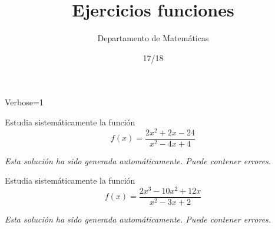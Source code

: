 \documentclass[palatino,nosec]{Docencia}
\title{Ejercicios funciones}
\author{Departamento de Matemáticas}
\date{17/18}
\begin{document}
\pagestyle{plain}


\newif\ifverbose
\verbosetrue
\ifverbose
\begin{sagesilent}
	Verbose=1
\end{sagesilent}
\else
\begin{sagesilent}
	Verbose=0
\end{sagesilent}
\fi




\begin{problem} Estudia sistemáticamente la función
	\[
		f(x) = \frac{2x^2+2x-24}{x^2-4x+4}
	\]
\solution

\textit{Esta solución ha sido generada automáticamente. Puede contener errores.}


\end{problem}


\begin{problem} Estudia sistemáticamente la función
	\[
		f(x) = \frac{2x^3-10x^2+12x}{x^2-3x+2}
	\]
\solution

\textit{Esta solución ha sido generada automáticamente. Puede contener errores.}


\end{problem}
\end{document}

